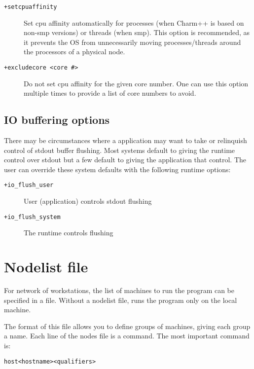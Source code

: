 \begin{description}

\item[{\tt +setcpuaffinity}]             Set cpu affinity
  automatically for processes (when Charm++ is based on non-smp
  versions) or threads (when smp). This option is recommended, as it
  prevents the OS from unnecessarily moving processes/threads around
  the processors of a physical node.

\item[{\tt +excludecore <core \#>}]       Do not set cpu affinity for the given core number. One can use this option multiple times to provide a list of core numbers to avoid.

\end{description}

\subsection{IO buffering options}
\label{io buffer options}
There may be circumstances where a \charmpp{} application may want to take
or relinquish control of stdout buffer flushing. Most systems default to
giving the \charmpp{} runtime control over stdout but a few default to
giving the application that control. The user can override these system
defaults with the following runtime options:

\begin{description}
\item[{\tt +io\_flush\_user}]     User (application) controls stdout flushing
\item[{\tt +io\_flush\_system}]   The \charmpp{} runtime controls flushing
\end{description}


\section{Nodelist file}

For network of workstations,
the list of machines to run the program can be specified in a file.
Without a nodelist file, \charmpp{} runs the program only on the
local machine.

The format of this file
allows you to define groups of machines, giving each group a name.
Each line of the nodes file is a command.  The most important command
is:

\begin{alltt}
host <hostname> <qualifiers>
\end{alltt}

